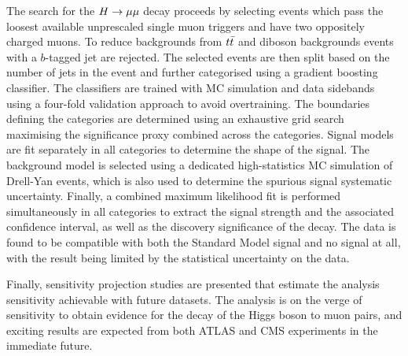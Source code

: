 The search for the $H \rightarrow \mu\mu$ decay proceeds by selecting
events which pass the loosest available unprescaled
single muon triggers and have two oppositely charged
muons. To reduce backgrounds from $t\bar{t}$ and diboson
backgrounds events with a $b$-tagged jet are rejected.
The selected events are then split based on the number
of jets in the event and further categorised using a 
gradient boosting classifier. The classifiers are trained
with MC simulation and data sidebands using a four-fold
validation approach to avoid overtraining. The boundaries
defining the categories are determined using an exhaustive
grid search maximising the significance proxy combined
across the categories. Signal models are fit separately
in all categories to determine the shape of the signal.
The background model is selected using a dedicated
high-statistics MC simulation of Drell-Yan events, which
is also used to determine the spurious signal systematic
uncertainty. Finally, a combined maximum likelihood fit
is performed simultaneously in all categories to
extract the signal strength and the associated confidence
interval, as well as the discovery significance of the
decay. The data is found to be compatible with both the
Standard Model signal and no signal at all, with the
result being limited by the statistical uncertainty on
the data.

Finally, sensitivity projection studies are presented
that estimate the analysis sensitivity achievable
with future datasets. The analysis is on the verge of
sensitivity to obtain evidence for the decay of the 
Higgs boson to muon pairs, and exciting results are
expected from both ATLAS and CMS experiments in the 
immediate future.






